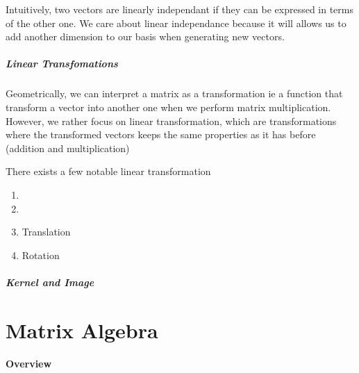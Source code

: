 \documentclass{article}
\begin{document}
Intuitively, two vectors are linearly independant if they can be expressed in
terms of the other one. We care about linear independance because it will allows
us to add another dimension to our basis when generating new vectors.

\begin{definition}
\end{definition}

\subsubsection{Linear Transfomations}

Geometrically, we can interpret a matrix as a transformation ie a function that
transform a vector into another one when we perform matrix multiplication. However,
we rather focus on linear transformation, which are transformations where the
transformed vectors keeps the same properties as it has before (addition and
multiplication)

\begin{definition}
\end{definition}

\begin{definition}
    There exists a few notable linear transformation
    \begin{enumerate}
	\item
	\item
	\item Translation
	\item Rotation
    \end{enumerate}
\end{definition}

\subsubsection{Kernel and Image}

\begin{definition}[Kernel]
\end{definition}

\begin{definition}[Image]
\end{definition}

\part{Matrix Algebra}
\subsection{Overview}
\end{document}
